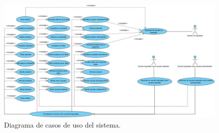 \begin{landscape}
    \begin{figure}[h]
        \centering\includegraphics[width=\hsize]{capitulos/capitulo8/requisitos.jpg}
        \caption{Diagrama de casos de uso del sistema.}
        \label{img_gantt}
    \end{figure}
\end{landscape}

